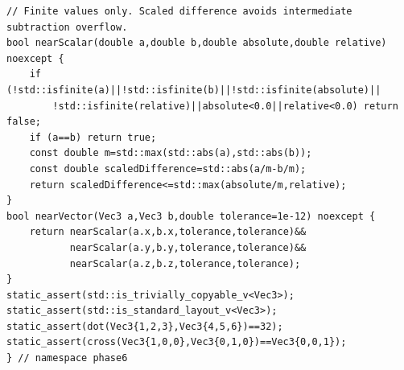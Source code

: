 \begin{verbatim}
// Finite values only. Scaled difference avoids intermediate subtraction overflow.
bool nearScalar(double a,double b,double absolute,double relative) noexcept {
    if (!std::isfinite(a)||!std::isfinite(b)||!std::isfinite(absolute)||
        !std::isfinite(relative)||absolute<0.0||relative<0.0) return false;
    if (a==b) return true;
    const double m=std::max(std::abs(a),std::abs(b));
    const double scaledDifference=std::abs(a/m-b/m);
    return scaledDifference<=std::max(absolute/m,relative);
}
bool nearVector(Vec3 a,Vec3 b,double tolerance=1e-12) noexcept {
    return nearScalar(a.x,b.x,tolerance,tolerance)&&
           nearScalar(a.y,b.y,tolerance,tolerance)&&
           nearScalar(a.z,b.z,tolerance,tolerance);
}
static_assert(std::is_trivially_copyable_v<Vec3>);
static_assert(std::is_standard_layout_v<Vec3>);
static_assert(dot(Vec3{1,2,3},Vec3{4,5,6})==32);
static_assert(cross(Vec3{1,0,0},Vec3{0,1,0})==Vec3{0,0,1});
} // namespace phase6


\end{verbatim}
